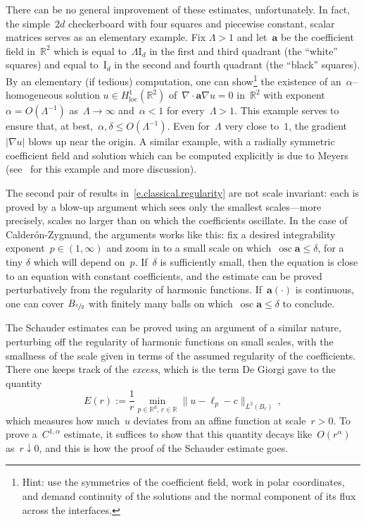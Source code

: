 \documentclass[11pt]{article} %
\numberwithin{equation}{section}
\theoremstyle{definition}
\newcommand*{\Id}{\ensuremath{\mathrm{I}_d}}
\newcommand*{\R}{\ensuremath{\mathbb{R}}}
\newcommand*{\Rd}{\ensuremath{\mathbb{R}^d}}
\renewcommand{\a}{\mathbf{a}}
\DeclareMathOperator*{\osc}{osc}
\begin{document}
\smallskip

There can be no general improvement of these estimates, unfortunately. In fact, the simple~$2d$ checkerboard with four squares and piecewise constant, scalar matrices serves as an elementary example. Fix $\Lambda>1$ and let~$\a$ be the coefficient field in~$\R^2$ which is equal to~$\Lambda  \Id$ in the first and third quadrant (the ``white'' squares) and equal to~$ \Id$ in the second and fourth quadrant (the ``black'' squares).  
By an elementary (if tedious) computation, 
one can show\footnote{Hint: use the symmetries of the coefficient field, work in polar coordinates, and demand continuity of the solutions and the normal component of its flux across the interfaces.} the existence of an~$\alpha$--homogeneous solution $u \in H^1_{\mathrm{loc}}(\R^2)$ of~$\nabla \cdot \a\nabla u = 0$ in~$\R^2$ with exponent~$\alpha = O(\Lambda^{-1})$ as~$\Lambda \to \infty$ and~$\alpha < 1$ for every~$\Lambda > 1$. 
This example serves to ensure that, at best,~$\alpha, \delta \leq O(\Lambda^{-1})$. Even for~$\Lambda$ very close to~$1$, the gradient~$|\nabla u|$ blows up near the origin. 
A similar example, with a radially symmetric coefficient field and solution which can be computed explicitly is due to Meyers (see~\cite[Chapter 3]{AKMBook} for this example and more discussion).


\smallskip

The second pair of results in~\eqref{e.classical.regularity} are not scale invariant: each is proved by a blow-up argument which sees only the smallest scales---more precisely, scales no larger than on which the coefficients oscillate. In the case of Calder\'on-Zygmund, the arguments works like this: fix a desired integrability exponent~$p\in(1,\infty)$ and zoom in to a small scale on which~$\osc \a \leq \delta$, for a tiny $\delta$ which will depend on~$p$. If~$\delta$ is sufficiently small, then the equation is close to an equation with constant coefficients, and the estimate can be proved perturbatively from the regularity of harmonic functions. If~$\a(\cdot)$ is continuous, one can cover $B_{\sfrac12}$ with finitely many balls on which~$\osc \a \leq \delta$  to conclude. 

\smallskip

The Schauder estimates can be proved using an argument of a similar nature, perturbing off the regularity of harmonic functions on small scales, with the smallness of the scale given in terms of the assumed regularity of the coefficients. There one keeps track of the \emph{excess}, which is the term De Giorgi gave to the quantity 
\begin{equation}
\label{e.excess}
E(r) := \frac1r \min_{p \in\Rd, \, c\in\R} \| u - \ell_p - c \|_{L^2(B_r)}
\,,
\end{equation}
which measures how much~$u$ deviates from an affine function at scale~$r>0$. To prove a~$C^{1,\alpha}$ estimate, it suffices to show that this quantity decays like~$O(r^\alpha)$ as~$r \downarrow 0$, and this is how the proof of the Schauder estimate goes. 
\end{document}
